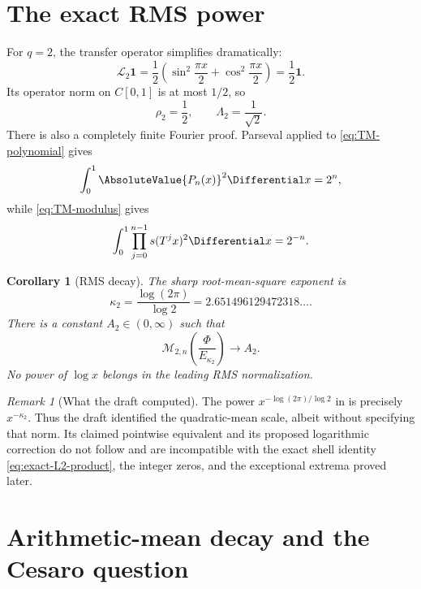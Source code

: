 \documentclass[11pt,oneside]{article}
\newtheorem{corollary}[corollary]{Corollary}
\theoremstyle{definition}
\theoremstyle{remark}
\newtheorem{remark}[remark]{Remark}
\newcommand{\Phiup}{\Phi}
\begin{document}
\section{The exact RMS power}
\label{sec:RMS}

For $q=2$, the transfer operator simplifies dramatically:
\begin{equation}
 \mathcal L_2\mathbf1
 =\frac12\left(\sin^2\frac{\pi x}{2}+\cos^2\frac{\pi x}{2}\right)
 =\frac12\mathbf1.
 \label{eq:L2-one}
\end{equation}
Its operator norm on $C[0,1]$ is at most $1/2$, so
\begin{equation}
 \rho_2=\frac12,
 \qquad
 \Lambda_2=\frac1{\sqrt2}.
 \label{eq:rho2}
\end{equation}
There is also a completely finite Fourier proof.  Parseval applied to
\eqref{eq:TM-polynomial} gives
\[
 \int_0^1\AbsoluteValue{P_n(x)}^2\Differential x=2^n,
\]
while \eqref{eq:TM-modulus} gives
\begin{equation}
 \int_0^1\prod_{j=0}^{n-1}s(T^jx)^2\Differential x=2^{-n}.
 \label{eq:exact-L2-product}
\end{equation}

\begin{corollary}[RMS decay]
\label{cor:RMS-decay}
The sharp root-mean-square exponent is
\begin{equation}
 \boxed{\displaystyle
 \kappa_2=\frac{\log(2\pi)}{\log2}
 =2.651496129472318\ldots .}
 \label{eq:kappa2}
\end{equation}
There is a constant $A_2\in(0,\infty)$ such that
\begin{equation}
 \mathcal M_{2,n}\!\left(\frac{\Phiup}{E_{\kappa_2}}\right)
 \longrightarrow A_2.
 \label{eq:RMS-limit}
\end{equation}
No power of $\log x$ belongs in the leading RMS normalization.
\end{corollary}

\begin{remark}[What the draft computed]
The power $x^{-\log(2\pi)/\log2}$ in \cite{decay-draft} is precisely
$x^{-\kappa_2}$.  Thus the draft identified the quadratic-mean scale, albeit without
specifying that norm.  Its claimed pointwise equivalent and its proposed logarithmic
correction do not follow and are incompatible with the exact shell identity
\eqref{eq:exact-L2-product}, the integer zeros, and the exceptional extrema proved later.
\end{remark}

\section{Arithmetic-mean decay and the Cesaro question}
\label{sec:L1-Cesaro}
\end{document}
